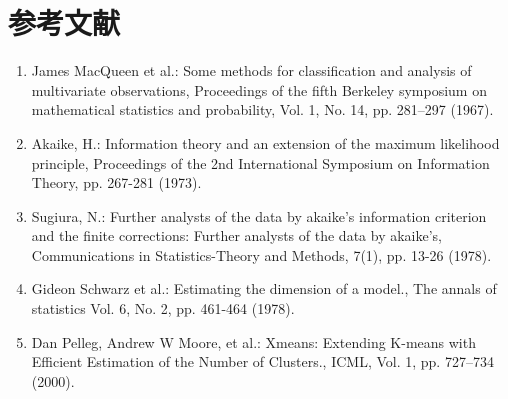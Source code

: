 \section*{参考文献}
\begin{enumerate}
\renewcommand{\labelenumi}{\arabic{enumi})}
  \item James MacQueen et al.:
    Some methods for classification and analysis of multivariate observations,
    Proceedings of the fifth Berkeley symposium on mathematical statistics and probability,
    Vol. 1, No. 14, pp. 281--297 (1967).
  \item Akaike, H.: 
    Information theory and an extension of the maximum likelihood principle, 
    Proceedings of the 2nd International Symposium on Information Theory, 
    pp. 267-281 (1973).
  \item Sugiura, N.:
    Further analysts of the data by akaike's information criterion and the finite corrections:
    Further analysts of the data by akaike's, 
    Communications in Statistics-Theory and Methods, 7(1), pp. 13-26 (1978).
  \item Gideon Schwarz et al.:
    Estimating the dimension of a model.,
    The annals of statistics Vol. 6, No. 2, pp. 461-464 (1978).
  \item Dan Pelleg, Andrew W Moore, et al.:
    Xmeans: Extending K-means with Efficient Estimation of the Number of Clusters.,
    ICML, Vol. 1, pp. 727--734 (2000).
\end{enumerate}
